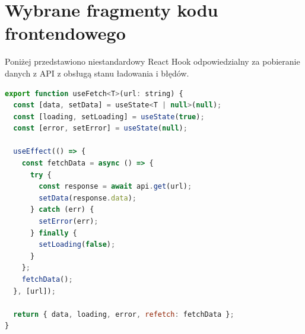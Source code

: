 \section{Wybrane fragmenty kodu frontendowego}

Poniżej przedstawiono niestandardowy React Hook odpowiedzialny za pobieranie danych z API z obsługą stanu ładowania i błędów.

\begin{lstlisting}[language=javascript, caption=Custom Hook useFetch, label=code:usefetch]
export function useFetch<T>(url: string) {
  const [data, setData] = useState<T | null>(null);
  const [loading, setLoading] = useState(true);
  const [error, setError] = useState(null);

  useEffect(() => {
    const fetchData = async () => {
      try {
        const response = await api.get(url);
        setData(response.data);
      } catch (err) {
        setError(err);
      } finally {
        setLoading(false);
      }
    };
    fetchData();
  }, [url]);

  return { data, loading, error, refetch: fetchData };
}
\end{lstlisting}


